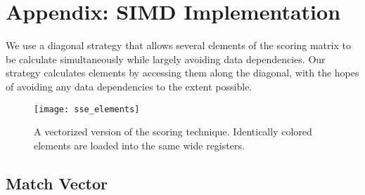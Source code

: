 \documentclass[paper=a4, fontsize=11pt]{scrartcl}
\numberwithin{equation}{section}		%
\numberwithin{figure}{section}			%
\numberwithin{table}{section}				%
\begin{document}
\clearpage

\section*{Appendix: SIMD Implementation}

We use a diagonal strategy that allows several elements of the scoring matrix to be calculate simultaneously while largely avoiding data dependencies.  Our strategy calculates elements by accessing them along the diagonal, with the hopes of avoiding any data dependencies to the extent possible.

\begin{figure}[H] %
	\texttt{[image: sse\_elements]}
		\caption{A vectorized version of the scoring technique.  Identically colored elements are loaded into the same wide registers. }
\end{figure}

\subsection{Match Vector}




 
\end{document}
